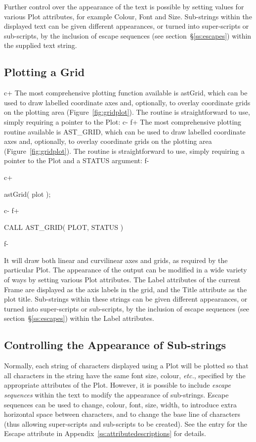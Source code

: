 \documentclass[twoside,11pt]{starlink}
\providecommand{\appref}[1]{Appendix~\ref{#1}}
\providecommand{\secref}[1]{\S\ref{#1}}
\begin{document}
Further control over the appearance of the text is possible by setting
values for various Plot attributes, for example Colour, Font and Size.
Sub-strings within the displayed text can be given different appearances,
or turned into super-scripts or sub-scripts, by the inclusion of escape
sequences (see section~\secref{ss:escapes}) within the supplied text string.

\subsection{\label{ss:plottingagrid}Plotting a Grid}

c+
The most comprehensive plotting function available is astGrid, which
can be used to draw labelled coordinate axes and, optionally, to
overlay coordinate grids on the plotting area
(Figure~\ref{fig:gridplot}). The routine is straightforward to use,
simply requiring a pointer to the Plot:
c-
f+
The most comprehensive plotting routine available is AST\_GRID, which
can be used to draw labelled coordinate axes and, optionally, to
overlay coordinate grids on the plotting area
(Figure~\ref{fig:gridplot}). The routine is straightforward to use,
simply requiring a pointer to the Plot and a STATUS argument:
f-

c+
\small
\begin{terminalv}
astGrid( plot );
\end{terminalv}
\normalsize
c-
f+
\small
\begin{terminalv}
      CALL AST_GRID( PLOT, STATUS )
\end{terminalv}
\normalsize
f-

It will draw both linear and curvilinear axes and grids, as required
by the particular Plot. The appearance of the output can be modified
in a wide variety of ways by setting various Plot attributes.
The Label attributes of the current Frame are displayed as the axis
labels in the grid, and the Title attribute as the plot title. Sub-strings
within these strings can be given different appearances, or turned into
super-scripts or sub-scripts, by the inclusion of escape sequences (see
section~\secref{ss:escapes}) within the Label attributes.

\subsection{\label{ss:escapes}Controlling the Appearance of Sub-strings}
Normally, each string of characters displayed using a Plot will be
plotted so that all characters in the string have the same font size,
colour, \emph{etc.}, specified by the appropriate attributes of the
Plot. However, it is possible to include \emph{escape sequences} within
the text to modify the appearance of sub-strings. Escape sequences can be
used to change, colour, font, size, width, to introduce extra horizontal
space between characters, and to change the base line of characters (thus
allowing super-scripts and sub-scripts to be created). See the entry for
the Escape attribute in \appref{ss:attributedescriptions} for details.
\end{document}
